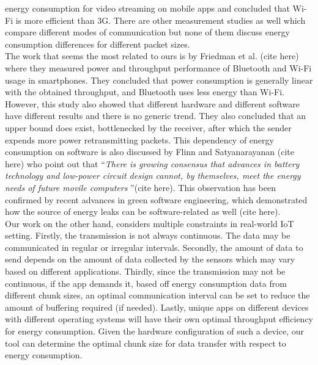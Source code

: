 energy consumption for video streaming on mobile apps and concluded that Wi-Fi is more 
efficient than 3G. There are other measurement studies as well which compare different modes 
of communication but none of them discuss energy consumption differences for different packet 
sizes. \\
The work that seems the most related to ours is by Friedman et al. (cite here) where they measured 
power and throughput performance of Bluetooth and Wi-Fi usage in smartphones. They concluded that 
power consumption is generally linear with the obtained throughput, and Bluetooth uses less 
energy than Wi-Fi. However, this study also showed that different hardware and different software 
have different results and there is no generic trend. They also concluded that an upper bound 
does exist, bottlenecked by the receiver, after which the sender expends more power 
retransmitting packets. This dependency of energy consumption on software is also discussed by 
Flinn and Satyanarayanan (cite here) who point out that \textquotedblleft \textit{There is growing 
consensus that advances in battery technology and low-power circuit design cannot, by themselves, 
meet the energy needs of future movile computers} \textquotedblright (cite here). This observation 
has been confirmed by recent advances in green software engineering, which demonstrated how the 
source of energy leaks can be software-related as well (cite here). \\
Our work on the other hand, considers multiple constraints in real-world IoT setting. Firstly, 
the transmission is not always continuous. The data may be communicated in regular or irregular 
intervals. Secondly, the amount of data to send depends on the amount of data collected by 
the sensors which may vary based on different applications. Thirdly, since the transmission may 
not be continuous, if the app demands it, based off energy consumption data from different chunk 
sizes, an optimal communication interval can be set to reduce the amount of buffering required 
(if needed). Lastly, unique apps on different devices with different operating systems will have 
their own optimal throughput efficiency for energy consumption. Given the hardware configuration 
of such a device, our tool can determine the optimal chunk size for data transfer with respect 
to energy consumption. \\
